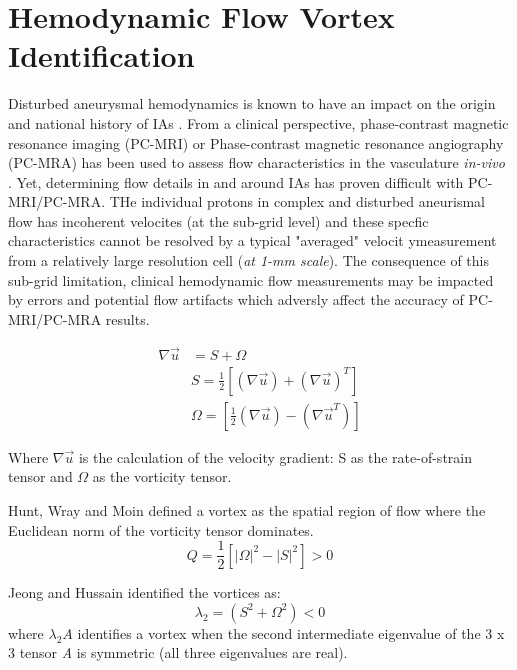 \cleartooddpage[\thispagestyle{empty}]
\chapter{Hemodynamic Flow Vortex Identification}\label{CHAPTER2}

Disturbed aneurysmal hemodynamics is known to have an impact on the origin and national history of IAs \cite{weir2002unruptured,brisman2006cerebral}. From a clinical perspective, phase-contrast magnetic resonance imaging (PC-MRI) or Phase-contrast magnetic resonance angiography (PC-MRA) has been used to assess flow characteristics in the vasculature \textit{in-vivo} \cite{benndorf1996intraaneurysmal,meckel2008vivo}. Yet, determining flow details in and around IAs has proven difficult with PC-MRI/PC-MRA. THe individual protons in complex and disturbed aneurismal flow has incoherent velocites (at the sub-grid level) and these specfic characteristics cannot be resolved by a typical "averaged" velocit ymeasurement from a relatively large resolution cell (\textit{at 1-mm scale}). The consequence of this sub-grid limitation, clinical hemodynamic flow measurements may be impacted by errors and potential flow artifacts which adversly affect the accuracy of PC-MRI/PC-MRA results. 

\begin{equation}
\begin{aligned}
\nabla \vec{u} & = S + \Omega \\
  			   & S = \frac{1}{2}\left[(\nabla \vec{u}) + (\nabla \vec{u})^T\right] \\
  			   & \Omega = \left[\frac{1}{2}(\nabla \vec{u}) - (\nabla \vec{u}^T)\right]
\end{aligned}
 \label{CHAPTER2_velocity_gradient_tensor}
\end{equation}

Where $\nabla\vec{u}$ is the calculation of the velocity gradient: S as the rate-of-strain tensor and $\Omega$ as the vorticity tensor.

Hunt, Wray and Moin \cite{hunt1988eddies} defined a vortex as the spatial region of flow where  the Euclidean norm of the vorticity tensor dominates.
\begin{equation}
Q = \frac{1}{2}\left[|\Omega|^2 - |S|^2\right] > 0
\label{CHAPTER2_Q}
\end{equation}

Jeong and Hussain identified the vortices as:
\begin{equation}
\lambda_2 = (S^2 + \Omega^2) < 0
\label{CHAPTER2_lambda2}
\end{equation}
where $\lambda_2{A}$ identifies a vortex when the second intermediate eigenvalue of the 3 x 3 tensor \textit{A} is symmetric (all three eigenvalues are real). 

